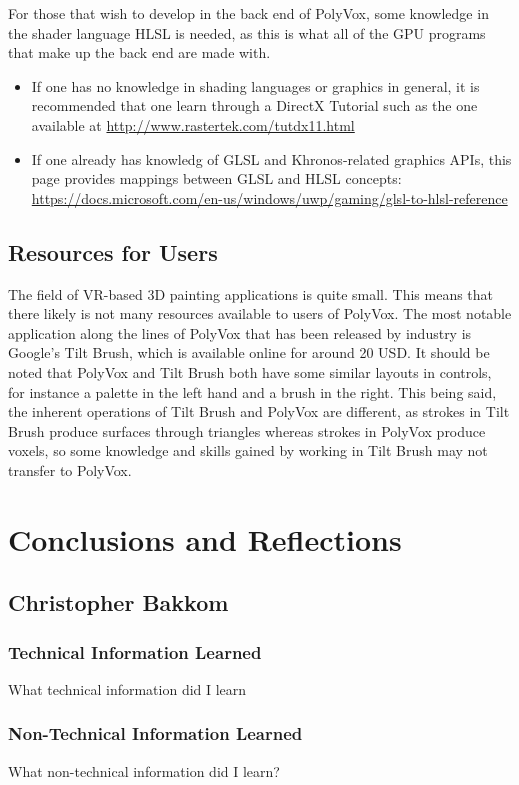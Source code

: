\documentclass[onecolumn, draftclsnofoot,10pt, compsoc]{IEEEtran}
\begin{document}
For those that wish to develop in the back end of PolyVox, some knowledge in the shader language HLSL is needed, as this is what all of the GPU programs that make up the back end are made with.
\begin{itemize}
\item If one has no knowledge in shading languages or graphics in general, it is recommended that one learn through a DirectX Tutorial such as the one available at \url{http://www.rastertek.com/tutdx11.html}
\item If one already has knowledg of GLSL and Khronos-related graphics APIs, this page provides mappings between GLSL and HLSL concepts: \url{https://docs.microsoft.com/en-us/windows/uwp/gaming/glsl-to-hlsl-reference}
\end{itemize}


\subsection{Resources for Users}
The field of VR-based 3D painting applications is quite small.
This means that there likely is not many resources available to users of PolyVox.
The most notable application along the lines of PolyVox that has been released by industry is Google’s Tilt Brush, which is available online for around 20 USD.
It should be noted that PolyVox and Tilt Brush both have some similar layouts in controls, for instance a palette in the left hand and a brush in the right.
This being said, the inherent operations of Tilt Brush and PolyVox are different, as strokes in Tilt Brush produce surfaces through triangles whereas strokes in PolyVox produce voxels, so some knowledge and skills gained by working in Tilt Brush may not transfer to PolyVox.


\section{Conclusions and Reflections}


\subsection{Christopher Bakkom}

\subsubsection{Technical Information Learned}
What technical information did I learn
\subsubsection{Non-Technical Information Learned}
What non-technical information did I learn?
\end{document}
